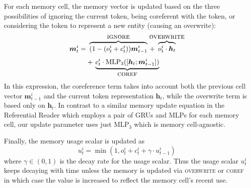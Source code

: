 \documentclass[12pt]{thesis-umich}[thesis]
\def\vec#1{\ensuremath{\boldsymbol{{#1}}}}
\newcommand{\actignore}{\textsc{ignore}\xspace}
\newcommand{\actcoref}{\textsc{coref}\xspace}
\newcommand{\actoverwrite}{\textsc{overwrite}\xspace}
\newcommand{\mlp}{\mathrm{MLP}}
\begin{document}
For each memory cell, the memory vector is updated based on the three possibilities of ignoring the current token, being coreferent with the token, or considering the token to represent a new entity (causing an overwrite):
\begin{equation}
	\begin{aligned}\label{memory_up}
		\vec{m}_t^{i}  = &\ \overbrace{(1 - (o_t^{i} + c_t^{i})) \vec{m}_{t-1}^{i}}^{\mbox{\actignore}}  \,+\!\!\!\!\!\! \overbrace{o_t^{i}\cdot \vec{h}_t}^{\mbox{\actoverwrite}} \\[3pt]
		& +\, \underbrace{c_t^{i} \cdot \mlp_3([\vec{h}_t; \vec{m}_{t-1}^i])}_{\mbox{\actcoref}}
	\end{aligned}
\end{equation}
In this expression, the coreference term takes into account both the previous cell vector $\vec{m}_{t-1}^{i}$ and the current token representation $\vec{h}_t$, while the overwrite term is based only on $\vec{h}_t$.  In contrast to a similar
memory update equation in the Referential Reader which employs a pair of GRUs and MLPs for each memory cell, our update parameter uses just $\mathrm{MLP}_3$ which is memory cell-agnostic. 

Finally, the memory usage scalar is
updated as
\begin{equation}
	u_t^{i} = \min(1, o_t^{i} + c_t^{i} + \gamma \cdot u_{t-1}^{i})
\end{equation}
where $\gamma \in (0, 1)$ is the decay rate for the usage scalar.
Thus the usage scalar $u_t^{i}$ keeps decaying with time unless the memory is updated via \actoverwrite or \actcoref in which case the value is increased to reflect the memory cell's recent use.
\end{document}
